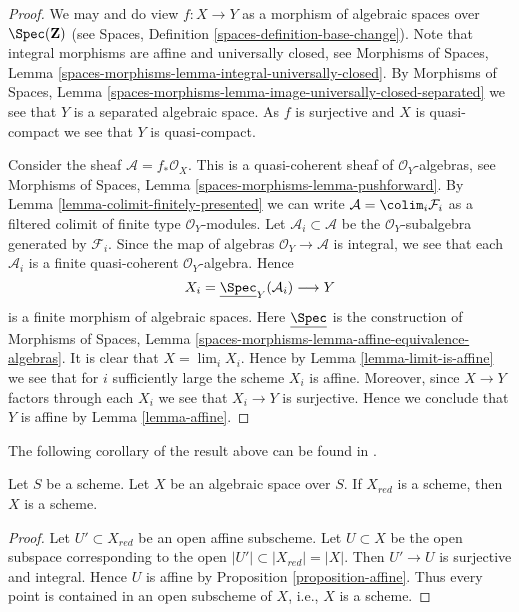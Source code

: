 \begin{proof}
We may and do view $f : X \to Y$ as a morphism of algebraic spaces over
$\Spec(\mathbf{Z})$ (see
Spaces, Definition \ref{spaces-definition-base-change}).
Note that integral morphisms are affine and universally closed, see
Morphisms of Spaces, Lemma
\ref{spaces-morphisms-lemma-integral-universally-closed}.
By Morphisms of Spaces, Lemma
\ref{spaces-morphisms-lemma-image-universally-closed-separated}
we see that $Y$ is a separated algebraic space.
As $f$ is surjective and $X$ is quasi-compact we see that $Y$ is
quasi-compact.

\medskip\noindent
Consider the sheaf $\mathcal{A} = f_*\mathcal{O}_X$.
This is a quasi-coherent sheaf of $\mathcal{O}_Y$-algebras, see
Morphisms of Spaces, Lemma \ref{spaces-morphisms-lemma-pushforward}.
By Lemma \ref{lemma-colimit-finitely-presented}
we can write $\mathcal{A} = \colim_i \mathcal{F}_i$ as a filtered
colimit of finite type $\mathcal{O}_Y$-modules. Let
$\mathcal{A}_i \subset \mathcal{A}$ be the $\mathcal{O}_Y$-subalgebra
generated by $\mathcal{F}_i$. Since the map of algebras
$\mathcal{O}_Y \to \mathcal{A}$ is integral, we see that each $\mathcal{A}_i$
is a finite quasi-coherent $\mathcal{O}_Y$-algebra. Hence
$$
X_i = \underline{\Spec}_Y(\mathcal{A}_i) \longrightarrow Y
$$
is a finite morphism of algebraic spaces. Here 
$\underline{\Spec}$ is the construction of Morphisms of Spaces, Lemma
\ref{spaces-morphisms-lemma-affine-equivalence-algebras}.
It is clear
that $X = \lim_i X_i$. Hence by
Lemma \ref{lemma-limit-is-affine}
we see that for $i$ sufficiently large the scheme $X_i$ is affine.
Moreover, since $X \to Y$ factors through each $X_i$ we see that
$X_i \to Y$ is surjective. Hence we conclude that $Y$ is affine by
Lemma \ref{lemma-affine}.
\end{proof}

\noindent
The following corollary of the result above can be found in
\cite{CLO}.

\begin{lemma}
\label{lemma-reduction-scheme}
\begin{reference}
\cite[3.1.12]{CLO}
\end{reference}
Let $S$ be a scheme. Let $X$ be an algebraic space over $S$.
If $X_{red}$ is a scheme, then $X$ is a scheme.
\end{lemma}

\begin{proof}
Let $U' \subset X_{red}$ be an open affine subscheme.
Let $U \subset X$ be the open subspace corresponding to the open
$|U'| \subset |X_{red}| = |X|$. Then $U' \to U$ is surjective and
integral. Hence $U$ is affine by
Proposition \ref{proposition-affine}.
Thus every point is contained in an open subscheme of $X$, i.e.,
$X$ is a scheme.
\end{proof}


